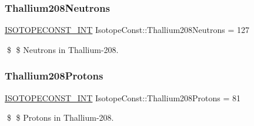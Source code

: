 \subsubsection{\texorpdfstring{Thallium208\+Neutrons}{Thallium208Neutrons}}
{\footnotesize\ttfamily \mbox{\hyperlink{group___isotope_const-_macros_ga5f18360b3e99483a35c32d789e62621c}{I\+S\+O\+T\+O\+P\+E\+C\+O\+N\+S\+T\+\_\+\+I\+NT}} Isotope\+Const\+::\+Thallium208\+Neutrons = 127}

\$ \$ Neutrons in Thallium-\/208. \mbox{\label{group___isotope_const-_thallium-_tl208_ga2c6d7b20dc37d5b359063c6c03333b2e}} 
\subsubsection{\texorpdfstring{Thallium208\+Protons}{Thallium208Protons}}
{\footnotesize\ttfamily \mbox{\hyperlink{group___isotope_const-_macros_ga5f18360b3e99483a35c32d789e62621c}{I\+S\+O\+T\+O\+P\+E\+C\+O\+N\+S\+T\+\_\+\+I\+NT}} Isotope\+Const\+::\+Thallium208\+Protons = 81}

\$ \$ Protons in Thallium-\/208. 